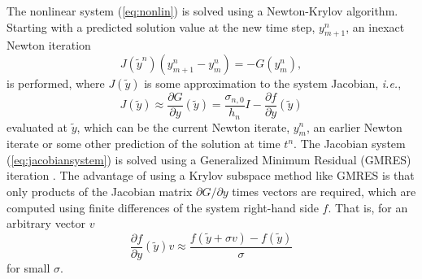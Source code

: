 The nonlinear system (\ref{eq:nonlin}) is solved using a Newton-Krylov
algorithm.  Starting with a predicted solution value at the new time
step, $y_{m+1}^n$, an inexact Newton iteration
%
\begin{equation}
  J(\tilde{y}^n)(y_{m+1}^n - y_m^n) = - G(y_m^n),
\label{eq:jacobiansystem}
\end{equation}
%
is performed, where $J(\tilde{y})$ is some approximation to the system
Jacobian, {\em i.e.},
%
\begin{equation}
  J(\tilde{y}) \approx  \frac{\partial G}{\partial y}(\tilde{y}) = \frac{\sigma_{n,0}}{h_n} I
     - \frac{\partial
     f}{\partial y}(\tilde{y})
\label{eq:jacobian}
\end{equation}
%
evaluated at $\tilde{y}$, which can be the current Newton iterate,
$y_m^n$, an earlier Newton iterate or some other prediction of the
solution at time $t^n$.  The Jacobian system (\ref{eq:jacobiansystem})
is solved using a Generalized Minimum Residual (GMRES) iteration \cite{SaSch86}.  The
advantage of using a Krylov subspace method like GMRES is that only
products of the Jacobian matrix $\partial G / \partial y$ times
vectors are required, which are computed using finite differences of
the system right-hand side $f$.  That is, for an arbitrary vector $v$
%
\begin{equation}
  \frac{\partial f}{\partial y}(\tilde{y}) v \approx
    \frac{f(\tilde{y} + \sigma v) - f(\tilde{y})}{\sigma}
\label{eq:finitedifferencejac}
\end{equation}
%
for small $\sigma$.


